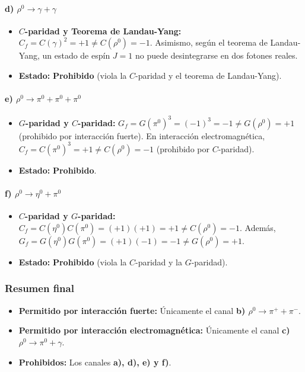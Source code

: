 \begin{problema}
\paragraph{d) $\rho^0 \rightarrow \gamma + \gamma$}
\begin{itemize}
    \item \textbf{$C$-paridad y Teorema de Landau-Yang:} $C_f = C(\gamma)^2 = +1 \neq C(\rho^0) = -1$. Asimismo, según el teorema de Landau-Yang, un estado de espín $J=1$ no puede desintegrarse en dos fotones reales.
    \item \textbf{Estado:} \textbf{Prohibido} (viola la $C$-paridad y el teorema de Landau-Yang).
\end{itemize}

\paragraph{e) $\rho^0 \rightarrow \pi^0 + \pi^0 + \pi^0$}
\begin{itemize}
    \item \textbf{$G$-paridad y $C$-paridad:} $G_f = G(\pi^0)^3 = (-1)^3 = -1 \neq G(\rho^0) = +1$ (prohibido por interacción fuerte). En interacción electromagnética, $C_f = C(\pi^0)^3 = +1 \neq C(\rho^0) = -1$ (prohibido por $C$-paridad).
    \item \textbf{Estado:} \textbf{Prohibido}.
\end{itemize}

\paragraph{f) $\rho^0 \rightarrow \eta^0 + \pi^0$}
\begin{itemize}
    \item \textbf{$C$-paridad y $G$-paridad:} $C_f = C(\eta^0) C(\pi^0) = (+1)(+1) = +1 \neq C(\rho^0) = -1$. Además, $G_f = G(\eta^0) G(\pi^0) = (+1)(-1) = -1 \neq G(\rho^0) = +1$.
    \item \textbf{Estado:} \textbf{Prohibido} (viola la $C$-paridad y la $G$-paridad).
\end{itemize}

\subsubsection*{Resumen final}

\begin{itemize}
    \item \textbf{Permitido por interacción fuerte:} Únicamente el canal \textbf{b) $\rho^0 \rightarrow \pi^+ + \pi^-$}.
    \item \textbf{Permitido por interacción electromagnética:} Únicamente el canal \textbf{c) $\rho^0 \rightarrow \pi^0 + \gamma$}.
    \item \textbf{Prohibidos:} Los canales \textbf{a), d), e) y f)}.
\end{itemize}
\end{problema}


